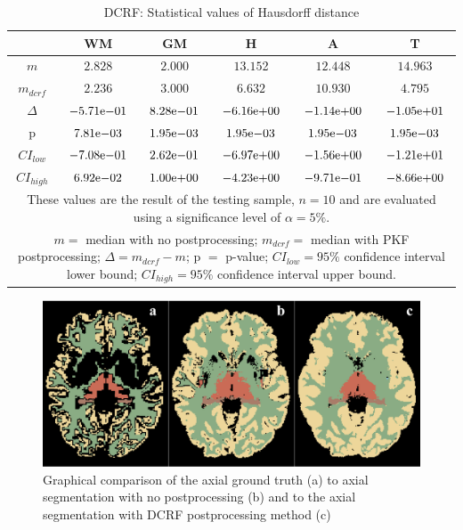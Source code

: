 \documentclass[journal]{IEEEtran}
\begin{document}
\begin{table}[ht]

\renewcommand{\arraystretch}{1.3}
\caption{DCRF: Statistical values of Hausdorff distance}
\label{tbl_dcrf_hd}
\centering
\begin{tabular}{c|c|c|c|c|c}
\hline
 & WM & GM & H & A & T\\
\hline
$m$&$2.828$&$2.000$&$13.15$2&$12.44$8&$14.963$\\
$m_{dcrf}$&$2.236$&$3.000$&$6.632$&$10.93$0&$4.795$\\
$\Delta$&${-5.71}\mathrm{e}{-01}$&${8.28}\mathrm{e}{-01}$&${-6.16}\mathrm{e}{+00}$&${-1.14}\mathrm{e}{+00}$&${-1.05}\mathrm{e}{+01}$\\
p&${7.81}\mathrm{e}{-03}$&${1.95}\mathrm{e}{-03}$&${1.95}\mathrm{e}{-03}$&${1.95}\mathrm{e}{-03}$&${1.95}\mathrm{e}{-03}$\\
$CI_{low}$&${-7.08}\mathrm{e}{-01}$&${2.62}\mathrm{e}{-01}$&${-6.97}\mathrm{e}{+00}$&${-1.56}\mathrm{e}{+00}$&${-1.21}\mathrm{e}{+01}$\\
$CI_{high}$	&${6.92}\mathrm{e}{-02}$&${1.00}\mathrm{e}{+00}$&${-4.23}\mathrm{e}{+00}$&${-9.71}\mathrm{e}{-01}$&${-8.66}\mathrm{e}{+00}$\\
\hline
\multicolumn{6}{p{\textwidth}}{These values are the result of the testing sample, $n=10$ and are evaluated using a significance level of $\alpha = 5\%$. }\\
\multicolumn{6}{p{\textwidth}}{$m=$ median with no postprocessing; $m_{dcrf}=$ median with PKF postprocessing; $\Delta=m_{dcrf}-m$; p $=$ p-value;  $CI_{low}= 95\%$ confidence interval lower bound; $CI_{high}= 95\%$ confidence interval upper bound.}\\

\end{tabular}

\end{table}

\begin{figure}[ht]
\centering
\includegraphics[width=\textwidth]{MIALab_Report/img/boxplots/DCRF.png}
\caption{Graphical comparison of the axial ground truth (a) to axial segmentation with no postprocessing (b) and to the axial segmentation with DCRF postprocessing method (c) }
\label{fig_dcrf}
\end{figure}
\end{document}
